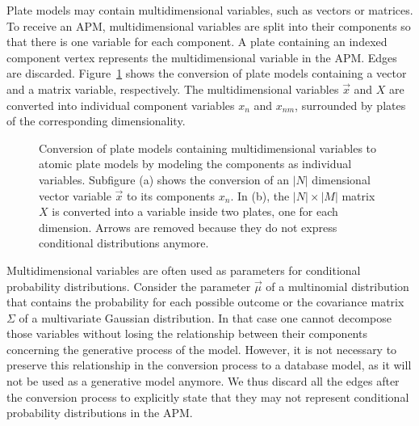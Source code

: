 Plate models may contain multidimensional variables, such as vectors or matrices. To receive an APM, multidimensional variables are split into their components so that there is one variable for each component. A plate containing an indexed component vertex represents the multidimensional variable in the APM. Edges are discarded. Figure~\ref{fig:pm2apm} shows the conversion of plate models containing a vector and a matrix variable, respectively. The multidimensional variables $\vec x$ and $X$ are converted into individual component variables $x_n$ and $x_{nm}$, surrounded by plates of the corresponding dimensionality.

\begin{figure}[t]
\centering
\scalebox{\tikzScale}{\adjustTikzSize }
\caption[Conversion of plate models to atomic plate models]{Conversion of plate models containing multidimensional variables to atomic plate models by modeling the components as individual variables. Subfigure (a) shows the conversion of an $|N|$ dimensional vector variable $\vec x$ to its components $x_n$. In (b), the $|N| \times |M|$ matrix $X$ is converted into a variable inside two plates, one for each dimension. Arrows are removed because they do not express conditional distributions anymore.}\label{fig:pm2apm}
\end{figure}

Multidimensional variables are often used as parameters for conditional probability distributions. Consider the parameter $\vec \mu$ of a multinomial distribution that contains the probability for each possible outcome or the covariance matrix $\Sigma$ of a multivariate Gaussian distribution. In that case one cannot decompose those variables without losing the relationship between their components concerning the generative process of the model. However, it is not necessary to preserve this relationship in the conversion process to a database model, as it will not be used as a generative model anymore. We thus discard all the edges after the conversion process to explicitly state that they may not represent conditional probability distributions in the APM.

